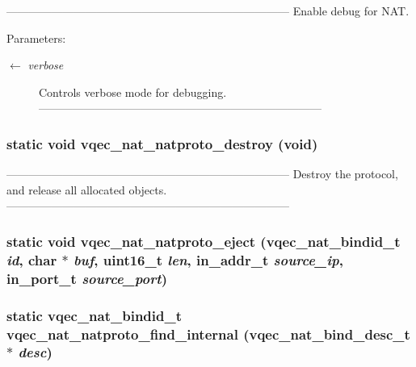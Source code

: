 --------------------------------------------------------------------------- Enable debug for NAT.

\begin{Desc}
\item[Parameters:]
\begin{description}
\item[\mbox{$\leftarrow$} {\em verbose}]Controls verbose mode for debugging. --------------------------------------------------------------------------- \end{description}
\end{Desc}
\subsubsection{\setlength{\rightskip}{0pt plus 5cm}static void vqec\_\-nat\_\-natproto\_\-destroy (void)\hspace{0.3cm}{\tt  [static]}}\label{vqec__nat__natproto_8c_99871884df024459dbb8fba4b7aec83c}


--------------------------------------------------------------------------- Destroy the protocol, and release all allocated objects. --------------------------------------------------------------------------- 
\subsubsection{\setlength{\rightskip}{0pt plus 5cm}static void vqec\_\-nat\_\-natproto\_\-eject (vqec\_\-nat\_\-bindid\_\-t {\em id}, char $\ast$ {\em buf}, uint16\_\-t {\em len}, in\_\-addr\_\-t {\em source\_\-ip}, in\_\-port\_\-t {\em source\_\-port})\hspace{0.3cm}{\tt  [static]}}\label{vqec__nat__natproto_8c_31108135edbfb77102b9f81ed4c898cd}


\subsubsection{\setlength{\rightskip}{0pt plus 5cm}static vqec\_\-nat\_\-bindid\_\-t vqec\_\-nat\_\-natproto\_\-find\_\-internal (vqec\_\-nat\_\-bind\_\-desc\_\-t $\ast$ {\em desc})\hspace{0.3cm}{\tt  [static]}}\label{vqec__nat__natproto_8c_404efe64d4aae2cb8370dc87f474e450}


